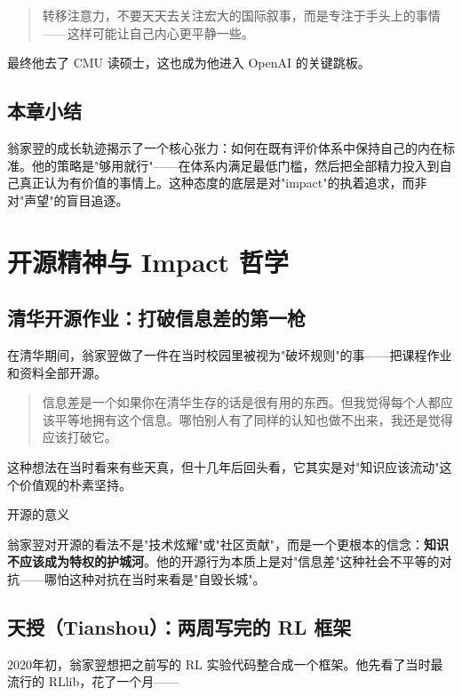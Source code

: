 \documentclass[a4paper]{article}
\begin{document}
\begin{quote}
转移注意力，不要天天去关注宏大的国际叙事，而是专注于手头上的事情——这样可能让自己内心更平静一些。
\end{quote}

最终他去了 CMU 读硕士，这也成为他进入 OpenAI 的关键跳板。

\subsection{本章小结}
翁家翌的成长轨迹揭示了一个核心张力：如何在既有评价体系中保持自己的内在标准。他的策略是"够用就行"——在体系内满足最低门槛，然后把全部精力投入到自己真正认为有价值的事情上。这种态度的底层是对"impact"的执着追求，而非对"声望"的盲目追逐。

\section{开源精神与 Impact 哲学}

\subsection{清华开源作业：打破信息差的第一枪}

在清华期间，翁家翌做了一件在当时校园里被视为"破坏规则"的事——把课程作业和资料全部开源。

\begin{quote}
信息差是一个如果你在清华生存的话是很有用的东西。但我觉得每个人都应该平等地拥有这个信息。哪怕别人有了同样的认知也做不出来，我还是觉得应该打破它。
\end{quote}

这种想法在当时看来有些天真，但十几年后回头看，它其实是对"知识应该流动"这个价值观的朴素坚持。

\begin{knowledgebox}{开源的意义}

翁家翌对开源的看法不是"技术炫耀"或"社区贡献"，而是一个更根本的信念：\textbf{知识不应该成为特权的护城河}。他的开源行为本质上是对"信息差"这种社会不平等的对抗——哪怕这种对抗在当时来看是"自毁长城"。
\end{knowledgebox}


\subsection{天授（Tianshou）：两周写完的 RL 框架}

2020年初，翁家翌想把之前写的 RL 实验代码整合成一个框架。他先看了当时最流行的 RLlib，花了一个月——
\end{document}
